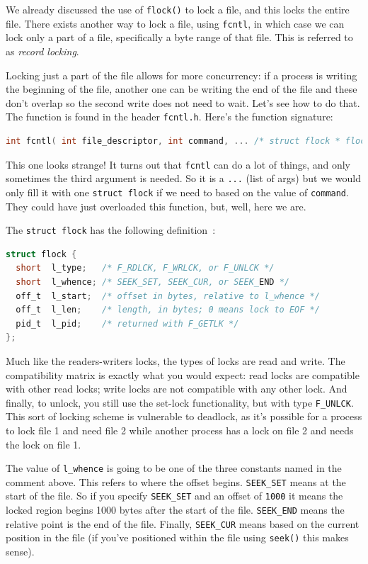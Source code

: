 \documentclass[a4paper]{report}
\begin{document}
We already discussed the use of \texttt{flock()} to lock a file, and this locks the entire file. There exists another way to lock a file, using \texttt{fcntl}, in which case we can lock only a part of a file, specifically a byte range of that file. This is referred to as \textit{record locking}.

Locking just a part of the file allows for more concurrency: if a process is writing the beginning of the file, another one can be writing the end of the file and these don't overlap so the second write does not need to wait. Let's see how to do that. The function is found in the header \texttt{fcntl.h}. Here's the function signature:

\begin{lstlisting}[language=C]
int fcntl( int file_descriptor, int command, ... /* struct flock * flockptr */ )
\end{lstlisting}

This one looks strange! It turns out that \texttt{fcntl} can do a lot of things, and only sometimes the third argument is needed. So it is a \texttt{...} (list of args) but we would only fill it with one \texttt{struct flock} if we need to based on the value of \texttt{command}. They could have just overloaded this function, but, well, here we are.

The \texttt{struct flock} has the following definition~\cite{apunix}:
\begin{lstlisting}[language=C]
struct flock {
  short  l_type;   /* F_RDLCK, F_WRLCK, or F_UNLCK */
  short  l_whence; /* SEEK_SET, SEEK_CUR, or SEEK_END */
  off_t  l_start;  /* offset in bytes, relative to l_whence */
  off_t  l_len;    /* length, in bytes; 0 means lock to EOF */
  pid_t  l_pid;    /* returned with F_GETLK */
};
\end{lstlisting}

Much like the readers-writers locks, the types of locks are read and write. The compatibility matrix is exactly what you would expect: read locks are compatible with other read locks; write locks are not compatible with any other lock. And finally, to unlock, you still use the set-lock functionality, but with type \texttt{F\_UNLCK}. This sort of locking scheme is vulnerable to deadlock, as it's possible for a process to lock file 1 and need file 2 while another process has a lock on file 2 and needs the lock on file 1.

The value of \texttt{l\_whence} is going to be one of the three constants named in the comment above. This refers to where the offset begins. \texttt{SEEK\_SET} means at the start of the file. So if you specify \texttt{SEEK\_SET} and an offset of \texttt{1000} it means the locked region begins 1000 bytes after the start of the file. \texttt{SEEK\_END} means the relative point is the end of the file. Finally, \texttt{SEEK\_CUR} means based on the current position in the file (if you've positioned within the file using \texttt{seek()} this makes sense).
\end{document}
